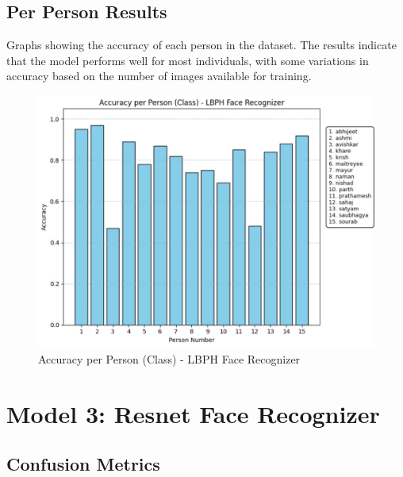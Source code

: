 \documentclass[openany]{report}
\begin{document}
\subsection{Per Person Results}
Graphs showing the accuracy of each person in the dataset. The results indicate that the model performs well for most individuals, with some variations in accuracy based on the number of images available for training.
\begin{figure}[H]
    \centering
    \includegraphics[width=.95\textwidth]{../imgs/accuracy per person.jpg}
    \caption{Accuracy per Person (Class) - LBPH Face Recognizer}
\end{figure}

\section{Model 3: Resnet Face Recognizer}
\subsection{Confusion Metrics}
\end{document}
